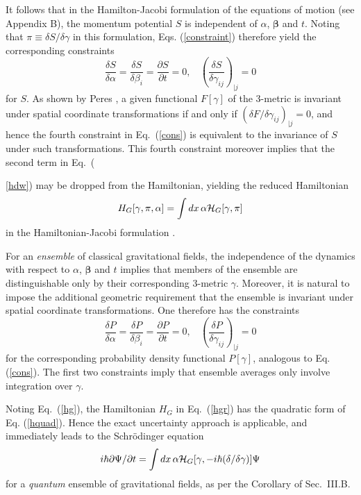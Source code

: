 \documentclass[a4paper,preprint, showpacs, aps, draft]{revtex4}
\begin{document}
{It follows that in the Hamilton-Jacobi formulation of the 
equations of motion (see Appendix B), 
the momentum potential $S$ is 
independent of $\alpha$, ${\bm \beta}$ and $t$.  Noting that
$\pi\equiv\delta S/\delta\gamma$ in this formulation, Eqs.
(\ref{constraint}) therefore yield the corresponding constraints
\begin{equation} \label{cons}
\frac{\delta S}{\delta \alpha} = \frac{\delta S}{\delta\beta_i} = 
\frac{\partial S}{\partial t} = 0,~~~~
\left(\frac{\delta S}{\delta\gamma_{ij}}\right)_{| j}=0  
\end{equation} 
for $S$.  As shown by Peres \cite{peres}, a given functional $F[\gamma]$ of the
3-metric is invariant under spatial coordinate transformations if and
only if $(\delta 
F/\delta\gamma_{ij})_{|j}=0$, and hence the fourth constraint
in Eq.~(\ref{cons}) is equivalent to the invariance of $S$ under such
transformations.  This fourth constraint moreover implies that the
second 
term in Eq.~({\ref{hdw}) may be dropped from the Hamiltonian, 
yielding the 
reduced Hamiltonian 
\begin{equation} \label{hgr}
H_G[\gamma,\pi,\alpha] = \int dx\,\alpha {\cal H}_G[\gamma,\pi] 
\end{equation}
in the Hamiltonian-Jacobi formulation \cite{peres, gerlach}.

For an {\it ensemble} of classical gravitational fields, the 
independence of the dynamics with respect to $\alpha$, ${\bm \beta}$ and 
$t$ implies that members of the ensemble are distinguishable only by their
corresponding 3-metric $\gamma$.  Moreover, it 
is natural to impose the additional geometric requirement that the ensemble is
invariant under spatial coordinate transformations.  One therefore has
the constraints
\begin{equation} \label{conp}
\frac{\delta P}{\delta\alpha}= \frac{\delta P}{\delta\beta_i} =
\frac{\partial P}{\partial t} = 0,~~~~
\left(\frac{\delta P}{\delta\gamma_{ij}}\right)_{| j}=0 
\end{equation}
for the corresponding probability density functional $P[\gamma]$,
analogous to Eq. (\ref{cons}). The first two constraints imply that
ensemble averages only involve integration over $\gamma$.
 
Noting Eq.~(\ref{hg}), the Hamiltonian $H_G$ in Eq.~(\ref{hgr}) 
has the quadratic form of Eq. (\ref{hquad}). Hence 
the exact uncertainty approach is applicable, and immediately leads to the
Schr\"{o}dinger equation 
\begin{equation} \label{seq}
i\hbar\partial\Psi/\partial t=\int dx\,\alpha {\cal H}_G[\gamma,
-i\hbar(\delta/\delta\gamma)]\Psi 
\end{equation}
for a {\it quantum} ensemble of gravitational fields, as per the
Corollary of Sec.~III.B.  

}}
\end{document}
